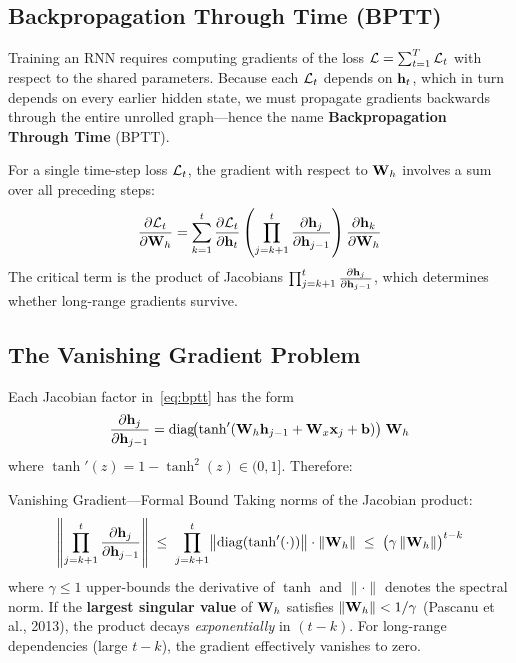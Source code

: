 \subsection{Backpropagation Through Time (BPTT)}

Training an RNN requires computing gradients of the loss
$\mathcal{L} = \sum_{t=1}^{T} \mathcal{L}_t$ with respect to the shared parameters.
Because each $\mathcal{L}_t$ depends on $\mathbf{h}_t$, which in turn depends on every
earlier hidden state, we must propagate gradients backwards through the
entire unrolled graph---hence the name
\textbf{Backpropagation Through Time} (BPTT).

For a single time-step loss $\mathcal{L}_t$, the gradient with respect to $\mathbf{W}_h$
involves a sum over all preceding steps:
\begin{equation}
\frac{\partial \mathcal{L}_t}{\partial \mathbf{W}_h}
= \sum_{k=1}^{t}
  \frac{\partial \mathcal{L}_t}{\partial \mathbf{h}_t}
  \left(\prod_{j=k+1}^{t} \frac{\partial \mathbf{h}_j}{\partial \mathbf{h}_{j-1}}\right)
  \frac{\partial \mathbf{h}_k}{\partial \mathbf{W}_h}
\label{eq:bptt}
\end{equation}
The critical term is the product of Jacobians
$\prod_{j=k+1}^{t} \frac{\partial \mathbf{h}_j}{\partial \mathbf{h}_{j-1}}$,
which determines whether long-range gradients survive.

\subsection{The Vanishing Gradient Problem}
\label{sec:vanishing}

Each Jacobian factor in~\eqref{eq:bptt} has the form
\begin{equation}
\frac{\partial \mathbf{h}_j}{\partial \mathbf{h}_{j-1}}
= \operatorname{diag}\!\bigl(\tanh'(\mathbf{W}_h \mathbf{h}_{j-1} + \mathbf{W}_x \mathbf{x}_j + \mathbf{b})\bigr)\;\mathbf{W}_h
\label{eq:jacobian}
\end{equation}
where $\tanh'(z) = 1 - \tanh^2(z) \in (0, 1]$.  Therefore:

\begin{mathresult}{Vanishing Gradient---Formal Bound}
Taking norms of the Jacobian product:
\begin{equation}
\left\lVert \prod_{j=k+1}^{t} \frac{\partial \mathbf{h}_j}{\partial \mathbf{h}_{j-1}} \right\rVert
\;\leq\;
\prod_{j=k+1}^{t}
  \bigl\lVert \operatorname{diag}(\tanh'(\cdot)) \bigr\rVert \cdot \lVert \mathbf{W}_h \rVert
\;\leq\;
\bigl(\gamma \,\lVert \mathbf{W}_h \rVert\bigr)^{t-k}
\label{eq:vanishing_bound}
\end{equation}
where $\gamma \leq 1$ upper-bounds the derivative of $\tanh$ and
$\lVert \cdot \rVert$ denotes the spectral norm.  If the \textbf{largest
singular value} of $\mathbf{W}_h$ satisfies $\lVert \mathbf{W}_h \rVert < 1/\gamma$
(Pascanu et al., 2013), the product decays \emph{exponentially} in
$(t - k)$.  For long-range dependencies (large $t - k$), the gradient
effectively vanishes to zero.
\end{mathresult}

